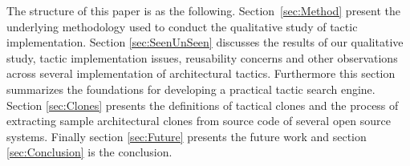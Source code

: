 The structure of this paper is as the following.
Section~\ref{sec:Method} present the underlying methodology used to conduct the qualitative study of tactic implementation.  Section \ref{sec:SeenUnSeen} discusses the results of our qualitative study, tactic implementation issues, reusability concerns and other  observations across several implementation of architectural tactics. Furthermore this section summarizes the foundations for developing a practical tactic search engine. Section \ref{sec:Clones} presents the definitions of tactical clones and the process of extracting sample architectural clones from source code of several open source systems. Finally section \ref{sec:Future} presents the future work and section \ref{sec:Conclusion} is the conclusion.